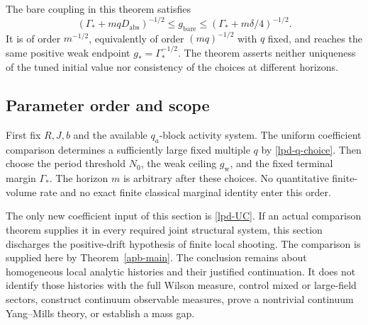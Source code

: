 The bare coupling in this theorem satisfies
\begin{equation}
 (\Gamma_*+mqD_{\mathrm{abs}})^{-1/2}
       \le g_{\mathrm{bare}}
       \le(\Gamma_*+m\delta/4)^{-1/2}.
 \label{lpd-bare-asymptotic}
\end{equation}
It is of order \(m^{-1/2}\), equivalently of order
\((mq)^{-1/2}\) with \(q\) fixed, and reaches the same positive
weak endpoint \(g_*=\Gamma_*^{-1/2}\). The theorem asserts neither
uniqueness of the tuned initial value nor consistency of the
choices at different horizons.

\subsection{Parameter order and scope}
\label{lpd-scope}

First fix \(R,J,b\) and the available \(q_a\)-block activity system.
The uniform coefficient comparison determines a sufficiently large
fixed multiple \(q\) by \eqref{lpd-q-choice}. Then choose the
period threshold \(N_0\), the weak ceiling \(g_{\mathrm w}\), and
the fixed terminal margin \(\Gamma_*\). The horizon \(m\) is
arbitrary after these choices. No quantitative finite-volume rate
and no exact finite classical marginal identity enter this order.

The only new coefficient input of this section is
\eqref{lpd-UC}. If an actual comparison theorem supplies it in
every required joint structural system, this section discharges
the positive-drift hypothesis of finite local shooting. The
comparison is supplied here by Theorem~\ref{apb-main}. The
conclusion remains about homogeneous local analytic histories
and their justified continuation. It does not identify those
histories with the full Wilson measure, control mixed or large-field
sectors, construct continuum observable measures, prove a
nontrivial continuum Yang--Mills theory, or establish a mass gap.
